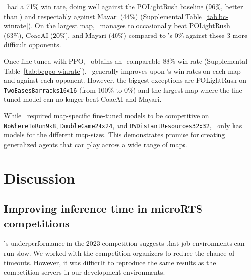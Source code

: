 \documentclass[conference]{IEEEtran}
\begin{document}
\bcAgent\ had a 71\% win rate, doing well against the POLightRush baseline (96\%, better than \agentName) and respectably against
Mayari (44\%) (Supplemental Table~\ref{tab:bc-winrate}). On the largest map, \bcAgent\ manages to occasionally beat POLightRush (63\%), CoacAI
(20\%), and Mayari (40\%) compared to \agentName's 0\% against these 3 more difficult opponents.

Once fine-tuned with PPO, \bcPPOAgent\ obtains an \agentName-comparable 88\% win rate
(Supplemental Table~\ref{tab:bcppo-winrate}). \bcPPOAgent\ generally improves upon \bcAgent's win
rates on each map and against each opponent. However, the biggest exceptions are
POLightRush on \texttt{TwoBasesBarracks16x16} (from 100\% to 0\%) and the largest map
where the fine-tuned model can no longer beat CoacAI and Mayari.

While \agentName\ required map-specific fine-tuned models to be competitive on
\texttt{NoWhereToRun9x8}, \texttt{DoubleGame24x24}, and \texttt{BWDistantResources32x32},
\bcPPOAgent\ only has models for the different map-sizes. This demonstrates promise for
creating generalized agents that can play across a wide range of maps.

\section{Discussion}
\subsection{Improving inference time in microRTS competitions}
\agentName's underperformance in the 2023 competition suggests that job
environments can run slow. We worked with the competition
organizers to reduce the chance of timeouts. However, it was difficult to reproduce the same results as
the competition servers in our development environments.
\end{document}
